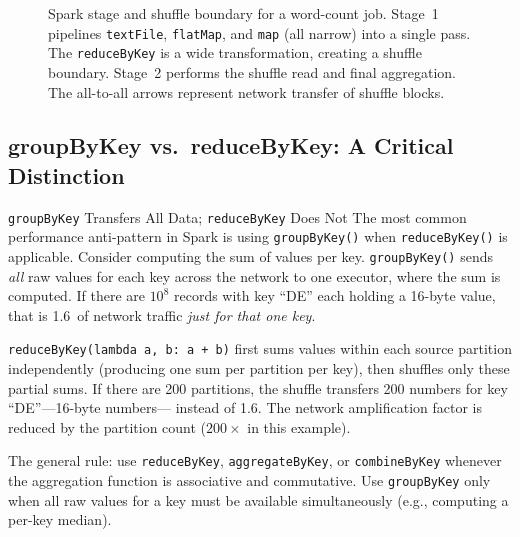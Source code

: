 \begin{figure}[h!t]
\caption{Spark stage and shuffle boundary for a word-count job. Stage~1 pipelines
         \texttt{textFile}, \texttt{flatMap}, and \texttt{map} (all narrow) into a
         single pass. The \texttt{reduceByKey} is a wide transformation, creating a
         shuffle boundary. Stage~2 performs the shuffle read and final aggregation.
         The all-to-all arrows represent network transfer of shuffle blocks.}
\label{fig:shuffle-boundary}
\end{figure}

\subsection{groupByKey vs.\ reduceByKey: A Critical Distinction}
\label{subsec:groupby-vs-reduceby}

\begin{caution}{\texttt{groupByKey} Transfers All Data; \texttt{reduceByKey} Does Not}
The most common performance anti-pattern in Spark is using
\texttt{groupByKey()} when \texttt{reduceByKey()} is applicable.
Consider computing the sum of values per key. \texttt{groupByKey()}
sends \emph{all} raw values for each key across the network to one
executor, where the sum is computed. If there are $10^8$ records with
key ``DE'' each holding a 16-byte value, that is 1.6\GB\ of network
traffic \emph{just for that one key}.

\texttt{reduceByKey(lambda a, b: a + b)} first sums values within each
source partition independently (producing one sum per partition per key),
then shuffles only these partial sums. If there are 200 partitions,
the shuffle transfers 200 numbers for key ``DE''---16-byte numbers---
instead of 1.6\GB. The network amplification factor is reduced by the
partition count ($200\times$ in this example).

The general rule: use \texttt{reduceByKey}, \texttt{aggregateByKey}, or
\texttt{combineByKey} whenever the aggregation function is associative
and commutative. Use \texttt{groupByKey} only when all raw values for a
key must be available simultaneously (e.g., computing a per-key median).
\end{caution}

